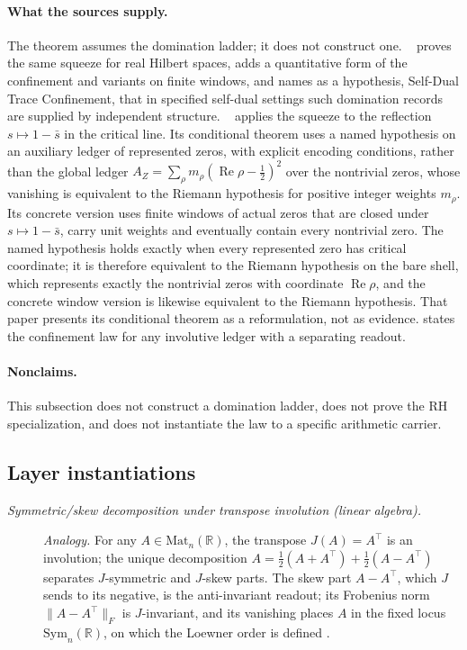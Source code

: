 \paragraph{What the sources supply.}
The theorem assumes the domination ladder; it does not construct one.
\PaperSDTC\ \citep{Tsiokos2026SDTC} proves the same squeeze for real
Hilbert spaces, adds a quantitative form of the confinement and
variants on finite windows, and names as a hypothesis, Self-Dual Trace
Confinement, that in specified self-dual settings such domination
records are supplied by independent structure.  \PaperRH\
\citep{Tsiokos2026RH} applies the squeeze to the reflection
\(s\mapsto1-\bar s\) in the critical line.  Its conditional theorem uses
a named hypothesis on an auxiliary ledger of represented zeros, with
explicit encoding conditions, rather than the global ledger
\(A_Z=\sum_\rho m_\rho(\operatorname{Re}\rho-\tfrac12)^2\) over the
nontrivial zeros, whose vanishing is equivalent to the Riemann
hypothesis for positive integer weights \(m_\rho\).  Its concrete
version uses finite windows of actual zeros that are closed under
\(s\mapsto1-\bar s\), carry unit weights and eventually contain every
nontrivial zero.  The named hypothesis holds exactly when every
represented zero has critical coordinate; it is therefore equivalent to
the Riemann hypothesis on the bare shell, which represents exactly the
nontrivial zeros with coordinate \(\operatorname{Re}\rho\), and the
concrete window version is likewise equivalent to the Riemann
hypothesis.  That paper presents its conditional theorem as a
reformulation, not as evidence.   states the
confinement law for any involutive ledger with a separating readout.


\paragraph{Nonclaims.} This subsection does not construct a domination
ladder, does not prove the RH specialization, and does not instantiate the
law to a specific arithmetic carrier.

\subsection*{Layer instantiations}\label{layer-inst:F14}

\begingroup\small
\begin{description}
\item[\emph{Symmetric/skew decomposition under transpose involution
(linear algebra).}] \textit{Analogy.}
For any \(A\in\mathrm{Mat}_n(\mathbb R)\), the transpose
\(J(A)=A^{\!\top}\) is an involution; the unique decomposition
\(A=\tfrac12(A+A^{\!\top})+\tfrac12(A-A^{\!\top})\) separates
\(J\)-symmetric and \(J\)-skew parts.  The skew part \(A-A^{\!\top}\), which \(J\) sends to its negative,
is the \Fref{F14} anti-invariant readout; its Frobenius norm
\(\lVert A-A^{\!\top}\rVert_F\) is \(J\)-invariant, and its vanishing
places \(A\) in the fixed locus \(\mathrm{Sym}_n(\mathbb R)\), on
which the Loewner order is defined
\citep{HornJohnson2013MatrixAnalysis}.

\end{description}
\endgroup


